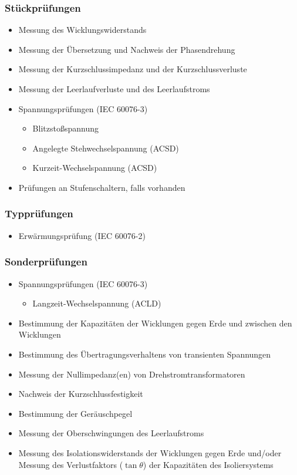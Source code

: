 \subsubsection*{Stückprüfungen}
\begin{itemize}[noitemsep]
    \item Messung des Wicklungswiderstands
    \item Messung der Übersetzung und Nachweis der Phasendrehung
    \item Messung der Kurzschlussimpedanz und der Kurzschlussverluste 
    \item Messung der Leerlaufverluste und des Leerlaufstroms
    \item Spannungsprüfungen (IEC 60076-3)
    \begin{itemize}
        \item Blitzstoßspannung
        \item Angelegte Stehwechselspannung (ACSD)
        \item Kurzeit-Wechselspannung (ACSD)
    \end{itemize} 
    \item Prüfungen an Stufenschaltern, falls vorhanden
\end{itemize}

\subsubsection*{Typprüfungen}
\begin{itemize}[noitemsep]
    \item Erwärmungsprüfung (IEC 60076-2)
\end{itemize}
\subsubsection*{Sonderprüfungen}
\begin{itemize}[noitemsep]
    \item Spannungsprüfungen (IEC 60076-3)
     \begin{itemize}
        \item Langzeit-Wechselspannung (ACLD)
    \end{itemize}
    \item Bestimmung der Kapazitäten der Wicklungen gegen Erde und zwischen den Wicklungen
    \item Bestimmung des Übertragungsverhaltens von transienten Spannungen
    \item Messung der Nullimpedanz(en) von Drehstromtransformatoren
    \item Nachweis der Kurzschlussfestigkeit
    \item Bestimmung der Geräuschpegel
    \item Messung der Oberschwingungen des Leerlaufstroms
    \item Messung des Isolationswiderstands der Wicklungen gegen Erde und/oder Messung des Verlustfaktors
    ($\tan\theta$) der Kapazitäten des Isoliersystems
\end{itemize}
